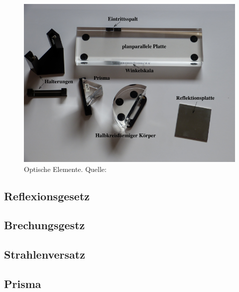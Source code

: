 \begin{figure}[H]
    \centering
    \includegraphics[scale = 0.3]{pictures/Teile.png}
    \caption{Optische Elemente. Quelle: \cite{AP01}}
    \label{fig:Teile}
\end{figure}

\subsection{Reflexionsgesetz}
\label{sec:reflexionsmessung}
\subsection{Brechungsgestz}
\label{sec:brechungmessung}
\subsection{Strahlenversatz}
\label{sec:strahlenversatzmessung}
\subsection{Prisma}
\label{sec:prismamessung}